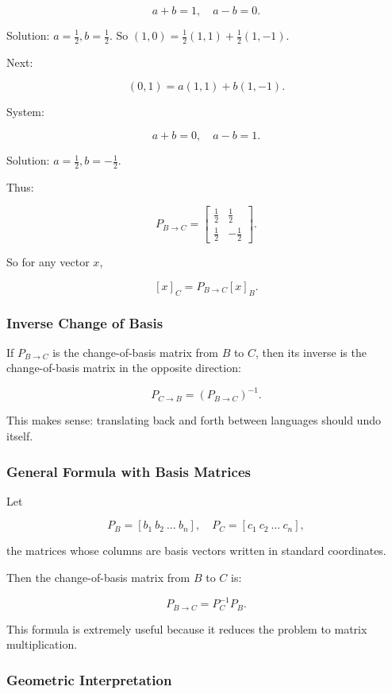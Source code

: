 \documentclass[
  letterpaper,
  DIV=11,
  numbers=noendperiod]{scrreprt}
\begin{document}
\[
a+b=1, \quad a-b=0.
\]

Solution: \(a=\tfrac{1}{2}, b=\tfrac{1}{2}\). So
\((1,0) = \tfrac{1}{2}(1,1) + \tfrac{1}{2}(1,-1)\).

Next:

\[
(0,1) = a(1,1) + b(1,-1).
\]

System:

\[
a+b=0, \quad a-b=1.
\]

Solution: \(a=\tfrac{1}{2}, b=-\tfrac{1}{2}\).

Thus:

\[
P_{B \to C} = \begin{bmatrix}  
\tfrac{1}{2} & \tfrac{1}{2} \\  
\tfrac{1}{2} & -\tfrac{1}{2}  
\end{bmatrix}.
\]

So for any vector \(x\),

\[
[x]_C = P_{B \to C}[x]_B.
\]

\subsubsection{Inverse Change of Basis}\label{inverse-change-of-basis}

If \(P_{B \to C}\) is the change-of-basis matrix from \(B\) to \(C\),
then its inverse is the change-of-basis matrix in the opposite
direction:

\[
P_{C \to B} = (P_{B \to C})^{-1}.
\]

This makes sense: translating back and forth between languages should
undo itself.

\subsubsection{General Formula with Basis
Matrices}\label{general-formula-with-basis-matrices}

Let

\[
P_B = [b_1 \ b_2 \ \dots \ b_n], \quad P_C = [c_1 \ c_2 \ \dots \ c_n],
\]

the matrices whose columns are basis vectors written in standard
coordinates.

Then the change-of-basis matrix from \(B\) to \(C\) is:

\[
P_{B \to C} = P_C^{-1} P_B.
\]

This formula is extremely useful because it reduces the problem to
matrix multiplication.

\subsubsection{Geometric
Interpretation}\label{geometric-interpretation-6}
\end{document}
